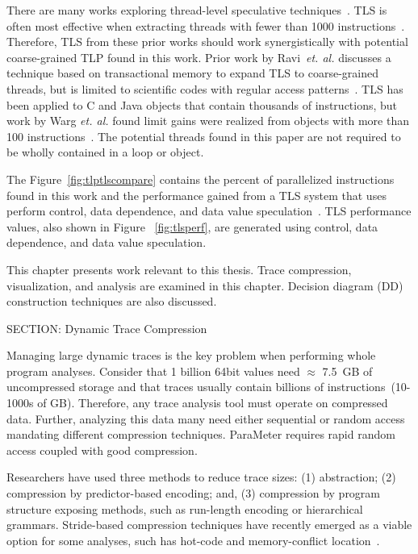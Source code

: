 {There are many works exploring thread-level speculative techniques~\cite{steffan:00:isca,vachharajani:07:pact,warg:2001:pact,wu:2008:cdp,chen:cc:2004,dou:2007:trans,wang:2009:dps,Rangan:2004kx,Ottoni:2005uq}. TLS is often most effective when extracting threads with fewer than 1000 instructions~\cite{marcuello:00:ipdps}.  Therefore, TLS from these prior works should work synergistically with potential coarse-grained TLP found in this work.  Prior work by Ravi~\textit{et. al.} discusses a technique based on transactional memory to expand TLS to coarse-grained threads, but is limited to scientific codes with regular access patterns~\cite{ramaseshan:08:nc}. TLS has been applied to C and Java objects that contain thousands of instructions, but work by Warg \textit{et. al.} found limit gains were realized from objects with more than 100 instructions~\cite{warg:2001:pact}. The potential threads found in this paper are not required to be wholly contained in a loop or object.

The Figure~\ref{fig:tlptlscompare} contains the percent of parallelized instructions found in this work and the performance gained from a TLS system that uses perform control, data dependence, and data value speculation~\cite{kejariwal:2007:tap}. TLS performance values, also shown in Figure ~\ref{fig:tlsperf}, are generated using control, data dependence, and data value speculation.


This chapter presents work relevant to this thesis.  Trace compression, visualization, and analysis are examined in this chapter. Decision diagram (DD) construction techniques are also discussed.

SECTION: Dynamic Trace Compression


Managing large dynamic traces is the key problem when performing whole program analyses. Consider that 1 billion 64bit values need $\approx$ 7.5~GB of uncompressed storage and that traces usually contain billions of instructions~(10-1000s of GB). Therefore, any trace analysis tool must operate on compressed data. Further, analyzing this data many need either sequential or random access mandating different compression techniques. ParaMeter requires rapid random access coupled with good compression.

Researchers have used three methods to reduce trace sizes: (1) abstraction; (2) compression by predictor-based encoding; and, (3) compression by program structure exposing methods, such as run-length encoding or hierarchical grammars.  Stride-based compression techniques have recently emerged as a viable option for some analyses, such has hot-code and memory-conflict location~\cite{minjang:10:micro}.

}
